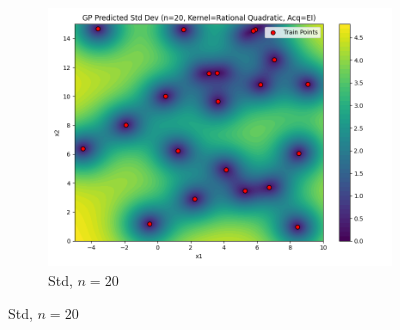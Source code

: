 \documentclass[a4paper,12pt]{article}
\begin{document}
\begin{figure}[H]
\begin{subfigure}{0.3\textwidth}
    \includegraphics[width=\linewidth]{Task-02/images/gp_std_rational_quadratic_n20_EI.png}
    \caption{Std, $n=20$}
\end{subfigure}


\end{figure}
\end{document}

